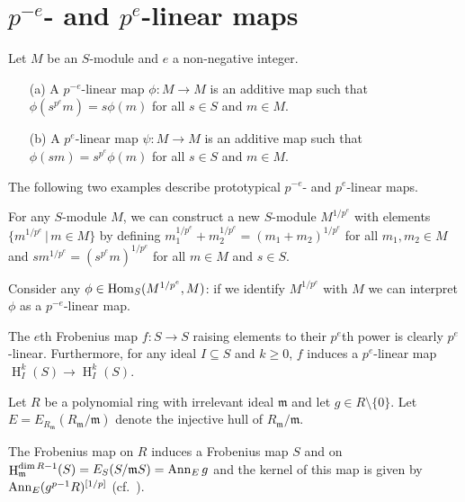 \documentclass[11pt]{amsart}
\DeclareMathOperator{\HH}{H}
\begin{document}
\section{$p^{-e}$- and $p^{e}$-linear maps}\label{Section: p-linear maps}

\begin{definition}%
Let  $M$ be an $S$-module and $e$ a non-negative integer.
\begin{enumerate}
 \item[(a)] A $p^{-e}$-linear map $\phi:M \rightarrow M$ is an additive map such that
 $\phi(s^{p^e} m)= s\phi(m)$ for all $s\in S$ and $m\in M$.
 \item[(b)] A $p^{e}$-linear map $\psi:M \rightarrow M$ is an additive map such that
 $\phi(s m)= s^{p^e}\phi(m)$ for all $s\in S$ and $m\in M$.
\end{enumerate}
\end{definition}


The following two examples describe  prototypical
$p^{-e}$- and $p^{e}$-linear maps.
\begin{example}
For any $S$-module $M$, we can construct a new $S$-module $M^{1/p^e}$ with elements $\{  m^{1/p^e} \,|\,m\in M\}$ by defining
$m_1^{1/p^e} +  m_2^{1/p^e} =  (m_1 +  m_2)^{1/p^e}$ for all $m_1, m_2 \in M$ and
$s  m^{1/p^e}=  (s^{p^e} m)^{1/p^e}$ for all $m\in M$ and $s\in S$.

Consider any $\phi\in \operatorname{Hom}_S(M^{1/p^e}, M)$: if we identify $M^{1/p^e}$ with $M$ we can interpret $\phi$ as a $p^{-e}$-linear map.
\end{example}

\begin{example}
The $e$th Frobenius map $f:S \rightarrow S$  raising elements to their $p^e$th power is clearly $p^{e}$-linear.
Furthermore, for any ideal $I\subseteq S$ and $k\geq 0$, $f$ induces a $p^{e}$-linear map $\HH_I^k (S) \rightarrow \HH_I^k (S)$.
\end{example}

Let $R$ be a polynomial ring with irrelevant ideal $\mathfrak{m}$ and let $g\in R\setminus \{0\}$.
Let $E=E_{R_{\mathfrak{m}}}(R_{\mathfrak{m}}/\mathfrak{m})$ denote the injective hull of $R_{\mathfrak{m}}/\mathfrak{m}$.

The Frobenius map on $R$ induces a Frobenius map $S$ and on
$\HH^{\dim R-1}_{\mathfrak{m}} (S)=E_S(S/\mathfrak{m}S)=\Ann_E g$ and the kernel of this map is given by
$\operatorname{{Ann}}_E (g^{p-1}R)^{[1/p]}$ (cf.~\cite[\S 5]{KatzmanParameterTestIdealOfCMRings}).
\end{document}

